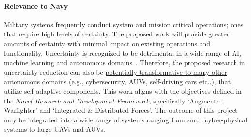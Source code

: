 \documentclass[12pt]{article}
\begin{document}

% 



% 


\vspace{-0mm}\paragraph{Relevance to Navy} 



Military systems frequently conduct system and mission critical operations; ones that require high levels of certainty. The proposed work will provide greater amounts of certainty with minimal impact on existing operations and functionality. Uncertainty is recognized to be detrimental in a wide range of AI, machine learning and autonomous domains~\cite{mahdavi2016classification, camara2017uncertainty, esfahani2013uncertainty}. Therefore, the proposed research in uncertainty reduction can also be \ul{potentially transformative to many other autonomous domains} (e.g., cybersecurity, AUVs, self-driving cars etc..), that utilize self-adaptive components. This work aligns with the objectives defined in the \emph{Naval Research and Development Framework}, specifically `Augmented Warfighter' and `Integrated \& Distributed Forces'. The outcome of this project may be integrated into a wide range of systems ranging from small cyber-physical systems to large UAVs and AUVs. 
\end{document}
